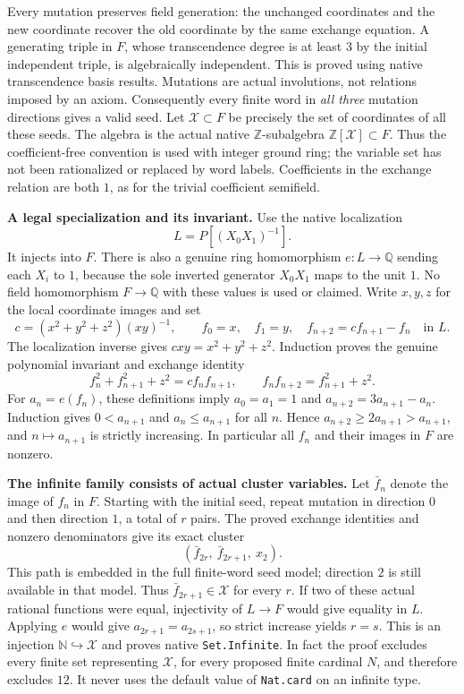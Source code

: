 \documentclass[10pt]{article}
\begin{document}
Every mutation preserves field generation: the unchanged coordinates and the new
coordinate recover the old coordinate by the same exchange equation. A generating
triple in $F$, whose transcendence degree is at least $3$ by the initial independent
triple, is algebraically independent. This is proved using native transcendence
basis results. Mutations are actual involutions, not relations imposed by an axiom.
Consequently every finite word in \emph{all three} mutation directions gives a valid
seed. Let $\mathcal X\subset F$ be precisely the set of coordinates of all these
seeds. The algebra is the actual native $\mathbb Z$-subalgebra
$\mathbb Z[\mathcal X]\subset F$. Thus the coefficient-free convention is used
with integer ground ring; the variable set has not been rationalized or replaced
by word labels. Coefficients in the exchange relation are both $1$, as for the
trivial coefficient semifield.

\textbf{A legal specialization and its invariant.}
Use the native localization
\[
 L=P[(X_0X_1)^{-1}].
\]
It injects into $F$. There is also a genuine ring homomorphism
$e:L\to\mathbb Q$ sending each $X_i$ to $1$, because the sole inverted generator
$X_0X_1$ maps to the unit $1$. No field homomorphism $F\to\mathbb Q$ with these
values is used or claimed.
Write $x,y,z$ for the local coordinate images and set
\[
 c=(x^2+y^2+z^2)(xy)^{-1},\qquad
 f_0=x,\quad f_1=y,\quad f_{n+2}=cf_{n+1}-f_n\quad\text{in }L.
\]
The localization inverse gives $cxy=x^2+y^2+z^2$. Induction proves the genuine
polynomial invariant and exchange identity
\[
 f_n^2+f_{n+1}^2+z^2=cf_nf_{n+1},\qquad
 f_nf_{n+2}=f_{n+1}^2+z^2.
\]
For $a_n=e(f_n)$, these definitions imply
$a_0=a_1=1$ and $a_{n+2}=3a_{n+1}-a_n$.
Induction gives $0<a_{n+1}$ and $a_n\le a_{n+1}$ for all $n$. Hence
$a_{n+2}\ge2a_{n+1}>a_{n+1}$, and $n\mapsto a_{n+1}$ is strictly increasing.
In particular all $f_n$ and their images in $F$ are nonzero.

\textbf{The infinite family consists of actual cluster variables.}
Let $\bar f_n$ denote the image of $f_n$ in $F$. Starting with the initial seed,
repeat mutation in direction $0$ and then direction $1$, a total of $r$ pairs.
The proved exchange identities and nonzero denominators give its exact cluster
\[
 (\bar f_{2r},\ \bar f_{2r+1},\ x_2).
\]
This path is embedded in the full finite-word seed model; direction $2$ is still
available in that model. Thus $\bar f_{2r+1}\in\mathcal X$ for every $r$.
If two of these actual rational functions were equal, injectivity of $L\to F$
would give equality in $L$. Applying $e$ would give
$a_{2r+1}=a_{2s+1}$, so strict increase yields $r=s$.
This is an injection $\mathbb N\hookrightarrow\mathcal X$ and proves native
\texttt{Set.Infinite}. In fact the proof excludes every finite set representing
$\mathcal X$, for every proposed finite cardinal $N$, and therefore excludes $12$.
It never uses the default value of \texttt{Nat.card} on an infinite type.
\end{document}
